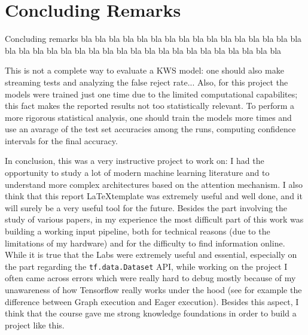 
\section{Concluding Remarks}

Concluding remarks bla bla bla bla bla bla bla bla bla bla bla bla bla bla bla bla bla bla bla bla bla bla bla bla bla bla bla bla bla bla bla bla bla bla bla bla  

This is not a complete way to evaluate a KWS model: one should also make streaming tests and analyzing the false reject rate... Also, for this project the models were trained just one time due to the limited computational capabilites; this fact makes the reported results not too statistically relevant. To perform a more rigorous statistical analysis, one should train the models more times and use an avarage of the test set accuracies among the runs, computing confidence intervals for the final accuracy.

In conclusion, this was a very instructive project to work on: I had the opportunity to study a lot of modern machine learning literature and to understand more complex architectures based on the attention mechanism. I also think that this report \LaTeX template was extremely useful and well done, and it will surely be a very useful tool for the future. Besides the part involving the study of various papers, in my experience the most difficult part of this work was building a working input pipeline, both for technical reasons (due to the limitations of my hardware) and for the difficulty to find information online. While it is true that the Labs were extremely useful and essential, especially on the part regarding the \verb|tf.data.Dataset| API, while working on the project I often came across errors which were really hard to debug mostly because of my unawareness of how Tensorflow really works under the hood (see for example the difference between Graph execution and Eager execution). Besides this aspect, I think that the course gave me strong knowledge foundations in order to build a project like this.

